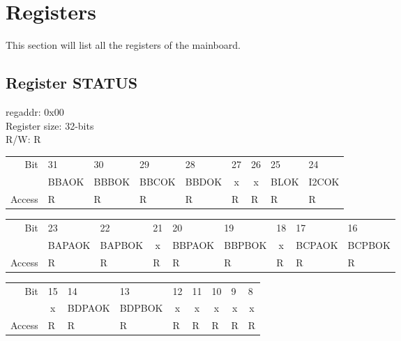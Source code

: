 \documentclass{article}
\begin{document}
\section{Registers}
This section will list all the registers of the mainboard.
\subsection{Register STATUS}
regaddr: 0x00\\
Register size: 32-bits\\
R/W: R\\
\begin{table}[h!]
    \centering
\begin{tabular}{rp{1.25cm}p{1.25cm}p{1.25cm}p{1.25cm}p{1.25cm}p{1.25cm}p{1.25cm}p{1.25cm}}
Bit &
  31 &
  30 &
  29 &
  28 &
  27 &
  26 &
  25 &
  24 \\ \cline{2-9} 
\multicolumn{1}{r|}{} &
  \multicolumn{1}{c|}{\scriptsize{BBAOK}} &
  \multicolumn{1}{c|}{\scriptsize{BBBOK}} & 
  \multicolumn{1}{c|}{\scriptsize{BBCOK}} &
  \multicolumn{1}{c|}{\scriptsize{BBDOK}} &
  \multicolumn{1}{c|}{\scriptsize{x}} &
  \multicolumn{1}{c|}{\scriptsize{x}} &
  \multicolumn{1}{c|}{\scriptsize{BLOK}} &
  \multicolumn{1}{c|}{\scriptsize{I2COK}} \\\cline{2-9} 
Access &
  R &
  R &
  R &
  R &
  R &
  R &
  R &
  R
\end{tabular}
\begin{tabular}{rp{1.25cm}p{1.25cm}p{1.25cm}p{1.25cm}p{1.25cm}p{1.25cm}p{1.25cm}p{1.25cm}}
Bit &
  23 &
  22 &
  21 &
  20 &
  19 &
  18 &
  17 &
  16 \\ \cline{2-9} 
\multicolumn{1}{r|}{} &
  \multicolumn{1}{c|}{\scriptsize{BAPAOK}} &
  \multicolumn{1}{c|}{\scriptsize{BAPBOK}} & 
  \multicolumn{1}{c|}{x} &
  \multicolumn{1}{c|}{\scriptsize{BBPAOK}} &
  \multicolumn{1}{c|}{\scriptsize{BBPBOK}} &
  \multicolumn{1}{c|}{x} &
  \multicolumn{1}{c|}{\scriptsize{BCPAOK}} &
  \multicolumn{1}{c|}{\scriptsize{BCPBOK}} \\\cline{2-9} 
Access &
  R &
  R &
  R &
  R &
  R &
  R &
  R &
  R
\end{tabular}
\begin{tabular}{rp{1.25cm}p{1.25cm}p{1.25cm}p{1.25cm}p{1.25cm}p{1.25cm}p{1.25cm}p{1.25cm}}
Bit &
  15 &
  14 &
  13 &
  12 &
  11 &
  10 &
  9 &
  8 \\ \cline{2-9} 
\multicolumn{1}{r|}{} &
  \multicolumn{1}{c|}{x} &
  \multicolumn{1}{c|}{\scriptsize{BDPAOK}} & 
  \multicolumn{1}{c|}{\scriptsize{BDPBOK}} &
  \multicolumn{1}{c|}{\scriptsize{x}} &
  \multicolumn{1}{c|}{\scriptsize{x}} &
  \multicolumn{1}{c|}{x} &
  \multicolumn{1}{c|}{\scriptsize{x}} &
  \multicolumn{1}{c|}{\scriptsize{x}} \\\cline{2-9} 
Access &
  R &
  R &
  R &
  R &
  R &
  R &
  R &
  R
\end{tabular}


\end{table}
\end{document}
